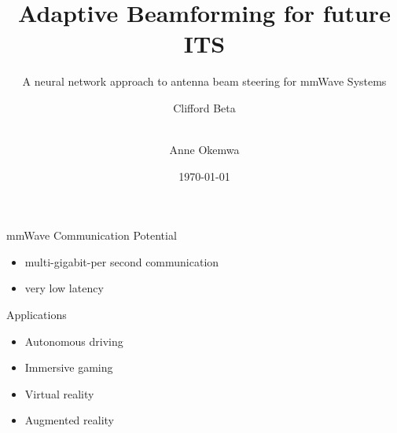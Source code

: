 \documentclass[10pt]{beamer}
\title{Adaptive Beamforming for future ITS}
\subtitle{A neural network approach to antenna beam steering for mmWave Systems}
\author{Clifford Beta \and \\Anne Okemwa}
\date{\today}
\begin{document}
\maketitle
    
\begin{frame}{mmWave Communication Potential}
  \begin{itemize}[<+- | alert@+>]
    \item \huge multi-gigabit-per second communication
    \item \huge very low latency
  \end{itemize}
\end{frame}
{
\begin{frame}{Applications}
  \begin{itemize}[<+- | alert@+>]
    \item \huge Autonomous driving
    \item \huge Immersive gaming
    \item \huge Virtual reality
    \item \huge Augmented reality
  \end{itemize}
\end{frame}
}
\end{document}
